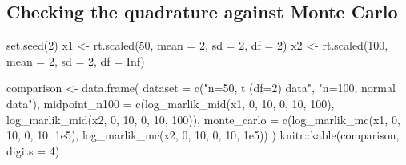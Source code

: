 \documentclass[
  letterpaper,
  DIV=11,
  numbers=noendperiod]{scrreprt}
\newenvironment{Shaded}{\begin{snugshade}}{\end{snugshade}}
\newcommand{\AttributeTok}[1]{\textcolor[rgb]{0.40,0.45,0.13}{#1}}
\newcommand{\ConstantTok}[1]{\textcolor[rgb]{0.56,0.35,0.01}{#1}}
\newcommand{\DecValTok}[1]{\textcolor[rgb]{0.68,0.00,0.00}{#1}}
\newcommand{\FloatTok}[1]{\textcolor[rgb]{0.68,0.00,0.00}{#1}}
\newcommand{\FunctionTok}[1]{\textcolor[rgb]{0.28,0.35,0.67}{#1}}
\newcommand{\NormalTok}[1]{\textcolor[rgb]{0.00,0.23,0.31}{#1}}
\newcommand{\OtherTok}[1]{\textcolor[rgb]{0.00,0.23,0.31}{#1}}
\newcommand{\SpecialCharTok}[1]{\textcolor[rgb]{0.37,0.37,0.37}{#1}}
\newcommand{\StringTok}[1]{\textcolor[rgb]{0.13,0.47,0.30}{#1}}
\begin{document}
\subsection{Checking the quadrature against Monte
Carlo}\label{checking-the-quadrature-against-monte-carlo}

\begin{Shaded}
\begin{Highlighting}[]
\FunctionTok{set.seed}\NormalTok{(}\DecValTok{2}\NormalTok{)}
\NormalTok{x1 }\OtherTok{\textless{}{-}} \FunctionTok{rt.scaled}\NormalTok{(}\DecValTok{50}\NormalTok{, }\AttributeTok{mean =} \DecValTok{2}\NormalTok{, }\AttributeTok{sd =} \DecValTok{2}\NormalTok{, }\AttributeTok{df =} \DecValTok{2}\NormalTok{)}
\NormalTok{x2 }\OtherTok{\textless{}{-}} \FunctionTok{rt.scaled}\NormalTok{(}\DecValTok{100}\NormalTok{, }\AttributeTok{mean =} \DecValTok{2}\NormalTok{, }\AttributeTok{sd =} \DecValTok{2}\NormalTok{, }\AttributeTok{df =} \ConstantTok{Inf}\NormalTok{)}

\NormalTok{comparison }\OtherTok{\textless{}{-}} \FunctionTok{data.frame}\NormalTok{(}
    \AttributeTok{dataset =} \FunctionTok{c}\NormalTok{(}\StringTok{"n=50, t (df=2) data"}\NormalTok{, }\StringTok{"n=100, normal data"}\NormalTok{),}
    \AttributeTok{midpoint\_n100 =} \FunctionTok{c}\NormalTok{(}\FunctionTok{log\_marlik\_mid}\NormalTok{(x1, }\DecValTok{0}\NormalTok{, }\DecValTok{10}\NormalTok{, }\DecValTok{0}\NormalTok{, }\DecValTok{10}\NormalTok{, }\DecValTok{100}\NormalTok{),}
                       \FunctionTok{log\_marlik\_mid}\NormalTok{(x2, }\DecValTok{0}\NormalTok{, }\DecValTok{10}\NormalTok{, }\DecValTok{0}\NormalTok{, }\DecValTok{10}\NormalTok{, }\DecValTok{100}\NormalTok{)),}
    \AttributeTok{monte\_carlo   =} \FunctionTok{c}\NormalTok{(}\FunctionTok{log\_marlik\_mc}\NormalTok{(x1, }\DecValTok{0}\NormalTok{, }\DecValTok{10}\NormalTok{, }\DecValTok{0}\NormalTok{, }\DecValTok{10}\NormalTok{, }\FloatTok{1e5}\NormalTok{),}
                       \FunctionTok{log\_marlik\_mc}\NormalTok{(x2, }\DecValTok{0}\NormalTok{, }\DecValTok{10}\NormalTok{, }\DecValTok{0}\NormalTok{, }\DecValTok{10}\NormalTok{, }\FloatTok{1e5}\NormalTok{))}
\NormalTok{)}
\NormalTok{knitr}\SpecialCharTok{::}\FunctionTok{kable}\NormalTok{(comparison, }\AttributeTok{digits =} \DecValTok{4}\NormalTok{)}
\end{Highlighting}
\end{Shaded}
\end{document}
